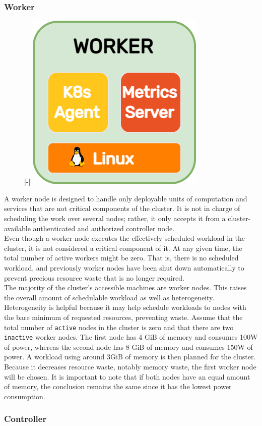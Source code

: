 \subsubsection{Worker}
\label{subsubsec:architecture_components_node_worker}

\begin{figure} %
  \raisebox{0pt}[\dimexpr\height-\baselineskip\relax]{\centering
  \includegraphics[width=.2\textwidth]{images/recluster/worker.png}}%
\end{figure}

A worker node is designed to handle only deployable units of computation and services
that are not critical components of the cluster. It is not in charge of
scheduling the work over several nodes; rather, it only accepts it from a
cluster-available authenticated and authorized controller node. \\ %
Even though a worker node executes the effectively scheduled workload in the
cluster, it is not considered a critical component of it. At any given time, the
total number of active workers might be zero. That is, there is no scheduled workload,
and previously worker nodes have been shut down automatically to prevent
precious resource waste that is no longer required. \\ %
The majority of the cluster's accessible machines are worker nodes. This raises the
overall amount of schedulable workload as well as heterogeneity. Heterogeneity
is helpful because it may help schedule workloads to nodes with the bare minimum
of requested resources, preventing waste. Assume that the total number of
\texttt{active} nodes in the cluster is zero and that there are two \texttt{inactive}
worker nodes. The first node has 4 GiB of memory and consumes 100W of power,
whereas the second node has 8 GiB of memory and consumes 150W of power. A workload
using around 3GiB of memory is then planned for the cluster. Because it
decreases resource waste, notably memory waste, the first worker node will be
chosen. It is important to note that if both nodes have an equal amount of memory,
the conclusion remains the same since it has the lowest power consumption.

\subsubsection{Controller}
\label{subsubsec:architecture_components_node_controller}

